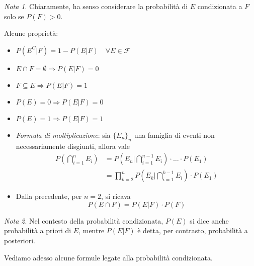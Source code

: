 \documentclass{article}
\theoremstyle{plain}
\theoremstyle{definition}
\theoremstyle{remark}
\newtheorem*{nota}{Nota}
\begin{document}
\begin{nota}
	Chiaramente, ha senso considerare la probabilità di $E$ condizionata a $F$ solo se $P(F)>0$.
\end{nota}
Alcune proprietà:
\begin{itemize}
	\item $P(E^C|F)=1-P(E|F)\quad\forall E\in\mathscr{F}$
	\item $E\cap F=\emptyset \Rightarrow P(E|F)=0$
	\item $F\subseteq E \Rightarrow P(E|F)=1$
	\item $P(E)=0 \Rightarrow P(E|F)=0$
	\item $P(E)=1 \Rightarrow P(E|F)=1$
	\item \textit{Formula di moltiplicazione}: sia $\{E_n\}_n$ una famiglia di eventi non necessariamente disgiunti, allora vale
	\begin{align*}
		P\left(\bigcap_{i=1}^n E_i\right)&=P\left(E_n|\bigcap_{i=1}^{n-1} E_i\right)\cdot\ldots\cdot P(E_1)\\
		&=\prod_{k=2}^n P\left(E_k|\bigcap_{i=1}^{k-1} E_i\right)\cdot P(E_1)
	\end{align*}
	\item Dalla precedente, per $n=2$, si ricava
	\begin{equation*}
		P(E\cap F)=P(E|F)\cdot P(F)
	\end{equation*}
\end{itemize}
\begin{nota}
	Nel contesto della probabilità condizionata, $P(E)$ si dice anche probabilità a priori di $E$, mentre $P(E|F)$ è detta, per contrasto, probabilità a posteriori.
\end{nota}
Vediamo adesso alcune formule legate alla probabilità condizionata.
\end{document}
